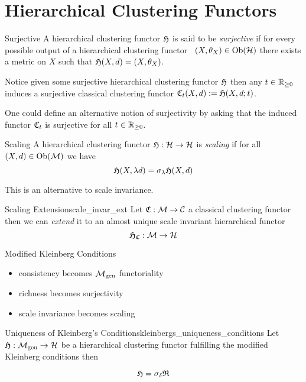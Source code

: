 \chapter{Hierarchical Clustering Functors}

\begin{definition}{Surjective}{}
    A hierarchical clustering functor $\mathfrak{H}$ is said to be \emph{surjective} if for every possible output of a hierarchical clustering functor \ie\ $(X, \theta_X) \in \mathrm {Ob}(\mathcal{H})$ there exists a metric on $X$ such that $\mathfrak{H}(X,d) = (X, \theta_X)$.
\end{definition}

Notice given some surjective hierarchical clustering functor $\mathfrak{H}$ then any $t \in \mathbb R_{\geq0}$ induces a surjective classical clustering functor $\mathfrak{C}_t(X,d) := \mathfrak{H}(X, d; t)$.


One could define an alternative notion of surjectivity by asking that the induced functor $\mathfrak{C}_t$ is surjective for all $t \in \mathbb R_{\geq0}$.

\begin{definition}{Scaling}{}
A hierarchical clustering functor $\mathfrak{H}: \mathcal{H} \to \mathcal{H}$ is \emph{scaling} if for all $(X,d) \in \mathrm {Ob}(\mathcal{M})$ we have
$$
\mathfrak{H}(X, \lambda d) = \sigma_\lambda \mathfrak{H}(X,d)
$$
\end{definition}
This is an alternative to scale invariance.


\begin{definition}{Scaling Extension}{scale_invar_ext}
Let $\mathfrak{C}: \mathcal{M} \to \mathcal{C}$ a classical clustering functor then we can \emph{extend} it to an almost unique scale invariant hierarchical functor
$$
\mathfrak{H}_{\mathfrak{C}}: \mathcal{M} \to \mathcal{H}
$$
\end{definition}


\begin{myremark}{Modified Kleinberg Conditions}{}
    \cite[Comment~7.3.1]{Carlsson2010}


    \begin{itemize}
        \item consistency becomes ${\mathcal{M}_\mathrm{gen}}$ functoriality
        \item richness becomes surjectivity
        \item scale invariance becomes scaling
    \end{itemize}
\end{myremark}

\begin{theorem}{Uniqueness of Kleinberg's Conditions}{kleinbergs_uniqueness_conditions}
    Let $\mathfrak{H}: {\mathcal{M}_\mathrm{gen}} \to \mathcal{H}$ be a hierarchical clustering functor fulfilling the modified Kleinberg conditions then

    $$
    \mathfrak{H} = \sigma_\delta \mathfrak{R}
    $$

\end{theorem}

